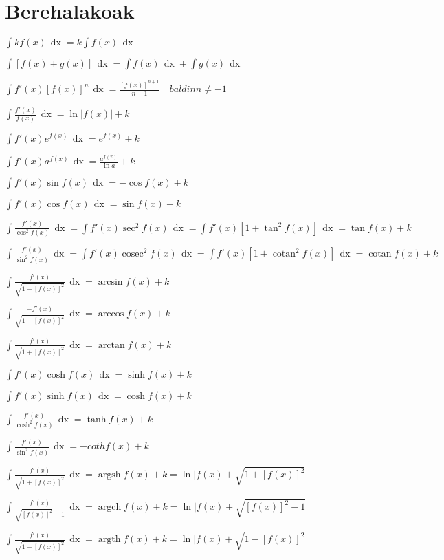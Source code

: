 \documentclass[8pt]{article}
\DeclareMathOperator{\xder}{\, \mathrm{d}x}
\DeclareMathOperator{\argsh}{argsh}
\DeclareMathOperator{\argch}{argch}
\DeclareMathOperator{\argth}{argth}
\DeclareMathOperator{\cosec}{cosec}
\DeclareMathOperator{\cotan}{cotan}
\begin{document}
	
	\section{Berehalakoak}

		$ \int k f(x) \xder = k \int f(x) \xder $

		$ \int [f(x) + g(x)] \xder = \int f(x) \xder + \int g(x) \xder $

		$ \int f\prime(x) {[ f(x) ]}^n \xder = \frac{{[f(x)]}^{n+1}}{n+1} \quad baldin n \neq -1 $

		$ \int \frac{f\prime(x)}{f(x)} \xder = \ln | f(x) | + k $

		$ \int f\prime(x) e^{f(x)} \xder = e^{f(x)} + k $

		$ \int f\prime(x) a^{f(x)} \xder = \frac{a^{f(x)}}{\ln a} + k $

		$ \int f\prime(x) \sin f(x) \xder = - \cos f(x) + k $

		$ \int f\prime(x) \cos f(x) \xder = \sin f(x) + k $

		$ \int \frac{f\prime(x)}{\cos^2 f(x)} \xder = \int f\prime(x) \sec^2 f(x) \xder = 
			\int f\prime(x) [ 1 + \tan^2 f(x) ] \xder = \tan f(x) + k $

		$ \int \frac{f\prime(x)}{\sin^2 f(x)} \xder = \int f\prime(x) \cosec^2 f(x) \xder = 
			\int f\prime(x) [ 1 + \cotan^2 f(x) ] \xder = \cotan f(x) + k $

		$ \int \frac{f\prime(x)}{\sqrt{1 - {[f(x)]}^{2}}} \xder = \arcsin f(x) + k $

		$ \int \frac{-f\prime(x)}{\sqrt{1 - {[f(x)]}^{2}}} \xder = \arccos f(x) + k $

		$ \int \frac{f\prime(x)}{\sqrt{1 + {[f(x)]}^{2}}} \xder = \arctan f(x) + k $

		$ \int f\prime(x) \cosh f(x) \xder = \sinh f(x) + k $

		$ \int f\prime(x) \sinh f(x) \xder = \cosh f(x) + k $

		$ \int \frac{f\prime(x)}{\cosh^2 f(x)} \xder = \tanh f(x) + k $

		$ \int \frac{f\prime(x)}{\sin^2 f(x)} \xder = - coth f(x) + k $

		$ \int \frac{f\prime(x)}{\sqrt{1 + {[f(x)]}^{2}}} \xder = \argsh f(x) + k = 
			\ln | f(x) + \sqrt{1 + {[f(x)]}^{2}} $

		$ \int \frac{f\prime(x)}{\sqrt{{[f(x)]}^{2}} - 1} \xder = \argch f(x) + k = 
			\ln | f(x) + \sqrt{{[f(x)]}^{2} - 1} $

		$ \int \frac{f\prime(x)}{\sqrt{1 - {[f(x)]}^{2}}} \xder = \argth f(x) + k = 
			\ln | f(x) + \sqrt{1 - {[f(x)]}^{2}} $
\end{document}

